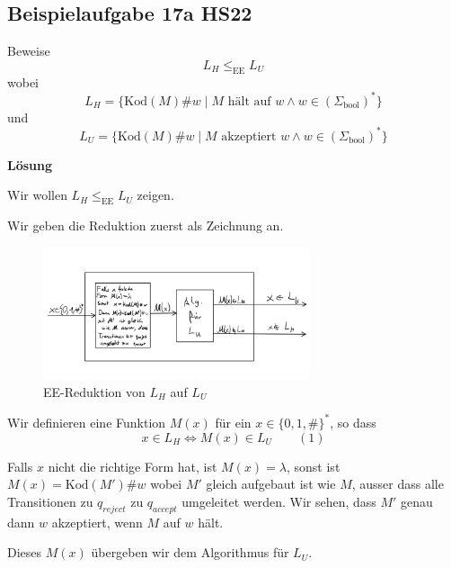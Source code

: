 \documentclass[a4paper, 11pt]{article}
\begin{document}
                    \subsection{Beispielaufgabe 17a HS22}

                    Beweise $$L_H \leq_{\text{EE}} L_U$$
                    wobei 
                    $$L_H = \{\text{Kod}(M)\#w \mid M\text{ hält auf }w\land w \in (\Sigma_{\text{bool}})^*\}$$
                    und 
                    $$L_U=\{\text{Kod}(M)\#w \mid M \text{ akzeptiert }w \land w \in (\Sigma_{\text{bool}})^*\}$$
                
                
                    \textbf{Lösung}
                
                    Wir wollen $L_H \leq_{\text{EE}} L_U$ zeigen.
                
                        Wir geben die Reduktion zuerst als Zeichnung an.
                
                        \begin{figure}[htp]
                            \centering
                            \includegraphics[width = 0.7\textwidth]{Images/17a_Zeichnung.png}
                            \caption{EE-Reduktion von $L_H$ auf $L_U$}
                        \end{figure}
                        
            
                    Wir definieren eine Funktion $M(x)$ für ein $x \in \{0,1,\#\}^*$, so dass
                        $$x \in L_H \iff M(x) \in L_U \qquad (1)$$
                    
                        Falls $x$ nicht die richtige Form hat, ist $M(x) = \lambda$, sonst ist $M(x) = \text{Kod}(M')\#w$ wobei $M'$ gleich aufgebaut ist wie $M$, ausser dass alle Transitionen zu $q_{reject}$ zu $q_{accept}$ umgeleitet werden. Wir sehen, dass $M'$ genau dann $w$ akzeptiert, wenn $M$ auf $w$ hält. 
                        
                        Dieses $M(x)$ übergeben wir dem Algorithmus für $L_U$. 
                
\end{document}
